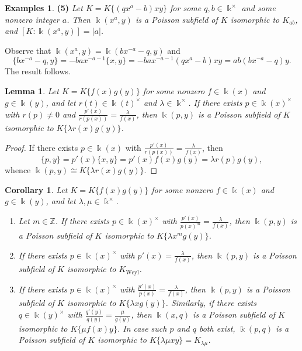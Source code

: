 \documentclass[12pt]{amsart}
\theoremstyle{plain}
\newtheorem{lemma}[theorem]{Lemma}
\newtheorem{corollary}[theorem]{Corollary}
\numberwithin{theorem}{section}
\numberwithin{equation}{theorem}
\theoremstyle{definition}
\newtheorem{examples}[theorem]{Examples}
\newcommand{\ZZ}{\mathbb{Z}}
\DeclareMathOperator{\Weyl}{Weyl}
\newcommand \Kweyl {K_{\Weyl}}
\newcommand \kx {\Bbbk^\times}
\begin{document}
\begin{examples}
\textbf{(5)}
\emph{Let $K = K\{(qx^a-b)xy\}$ for some $q,b \in \kx$ and 
some nonzero integer $a$. Then $\Bbbk(x^a,y)$ is a Poisson 
subfield of $K$ isomorphic to $K_{ab}$, and 
$[K: \Bbbk(x^a,y)] = |a|$.}

Observe that $\Bbbk(x^a,y) = \Bbbk(bx^{-a}-q,y)$ and
$$
\{ bx^{-a}-q, y \} = -ba x^{-a-1} \{x,y\} 
= - ba x^{-a-1} (qx^a-b)xy = ab (bx^{-a}-q) y.
$$
The result follows.
\end{examples}


\begin{lemma}
\label{zzlem1.6}
Let $K = K\{f(x)g(y)\}$ for some nonzero $f \in \Bbbk(x)$ 
and $g \in \Bbbk(y)$, and let $r(t) \in \Bbbk(t)^\times$ 
and $\lambda \in \kx$. If there exists $p \in \Bbbk(x)^\times$ 
with $r(p) \ne 0$ and $\frac{p'(x)}{r(p(x))} = \frac\lambda{f(x)}$, then 
$\Bbbk(p,y)$ is a Poisson subfield of $K$ isomorphic to 
$K\{\lambda r(x)g(y)\}$. 
\end{lemma}

\begin{proof}
If there exists $p \in \Bbbk(x)$ with 
$\frac{p'(x)}{r(p(x))} = \frac\lambda{f(x)}$, then 
$$
\{p,y\} = p'(x) \{x,y\} = p'(x) f(x) g(y) = \lambda r(p) g(y),
$$
whence $\Bbbk(p,y) \cong K\{\lambda r(x)g(y)\}$. 
\end{proof}


\begin{corollary}
\label{zzcor1.7}
Let $K = K\{f(x)g(y)\}$ for some nonzero $f \in \Bbbk(x)$ 
and $g \in \Bbbk(y)$, and let $\lambda,\mu \in \kx$.
\begin{enumerate}
\item
Let $m \in \ZZ$. If there exists $p \in \Bbbk(x)^\times$ with 
$\frac{p'(x)}{p(x)^m} = \frac\lambda{f(x)}$, then $\Bbbk(p,y)$ 
is a Poisson subfield of $K$ isomorphic to 
$K\{\lambda x^mg(y)\}$. 
\item
If there exists $p \in \Bbbk(x)^\times$ with 
$p'(x) = \frac\lambda{f(x)}$, then $\Bbbk(p,y)$ is a Poisson 
subfield of $K$ isomorphic to $\Kweyl$. 
\item
If there exists $p \in \Bbbk(x)^\times$ with 
$\frac{p'(x)}{p(x)} = \frac\lambda{f(x)}$, then $\Bbbk(p,y)$ 
is a Poisson subfield of $K$ isomorphic to $K\{\lambda xg(y)\}$. 
Similarly, if there exists $q \in \Bbbk(y)^\times$ with 
$\frac{q'(y)}{q(y)} = \frac\mu{g(y)}$, then $\Bbbk(x,q)$ is a 
Poisson subfield of $K$ isomorphic to $K\{\mu f(x)y\}$. In case 
such $p$ and $q$ both exist, $\Bbbk(p,q)$ is a Poisson 
subfield of $K$ isomorphic to $K\{\lambda \mu xy\}=K_{\lambda\mu}$.
\end{enumerate}
\end{corollary}
\end{document}
